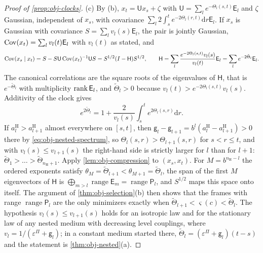 \begin{proof}[Proof of \cref{prop:obj-clocks}]
(c) By (b), $x_t=\mathsf Ux_s+\zeta$ with $\mathsf U=\sum_le^{-\Theta_l(s,t)}\mathsf E_l$ and $\zeta$ Gaussian, independent of $x_s$, with covariance $\sum_l2\int_s^te^{-2\Theta_l(r,t)}\mathrm dr\mathsf E_l$. If $x_s$ is Gaussian with covariance $S=\sum_lv_l(s)\mathsf E_l$, the pair is jointly Gaussian, $\operatorname{Cov}(x_t)=\sum_lv_l(t)\mathsf E_l$ with $v_l(t)$ as stated, and
\[
\operatorname{Cov}(x_s\mid x_t)=S-S\mathsf U\operatorname{Cov}(x_t)^{-1}\mathsf US=S^{1/2}(I-\mathsf H)S^{1/2},\qquad\mathsf H=\sum_l\frac{e^{-2\Theta_l(s,t)}v_l(s)}{v_l(t)}\mathsf E_l=\sum_le^{-2\tilde\Theta_l}\mathsf E_l.
\]
The canonical correlations are the square roots of the eigenvalues of $\mathsf H$, that is $e^{-\tilde\Theta_l}$ with multiplicity $\operatorname{rank}\mathsf E_l$, and $\tilde\Theta_l>0$ because $v_l(t)>e^{-2\Theta_l(s,t)}v_l(s)$. Additivity of the clock gives
\[
e^{2\tilde\Theta_l}=1+\frac2{v_l(s)}\int_s^te^{2\Theta_l(s,r)}\mathrm dr.
\]
If $a^{\mathrm H}_l>a^{\mathrm H}_{l+1}$ almost everywhere on $[s,t]$, then $\mathsf g_l-\mathsf g_{l+1}=b^l(a^{\mathrm H}_l-a^{\mathrm H}_{l+1})>0$ there by \eqref{eq:obj-nested-spectrum}, so $\Theta_l(s,r)>\Theta_{l+1}(s,r)$ for $s<r\le t$, and with $v_l(s)\le v_{l+1}(s)$ the right-hand side is strictly larger for $l$ than for $l+1$: $\tilde\Theta_1>\dots>\tilde\Theta_{n_{\mathrm H}+1}$. Apply \cref{lem:obj-compression} to $(x_s,x_t)$. For $M=b^{n_{\mathrm H}-l}$ the ordered exponents satisfy $\theta_M=\tilde\Theta_{l+1}<\theta_{M+1}=\tilde\Theta_l$, the span of the first $M$ eigenvectors of $\mathsf H$ is $\bigoplus_{m>l}\operatorname{range}\mathsf E_m=\operatorname{range}\mathsf P_l$, and $S^{1/2}$ maps this space onto itself. The argument of \cref{thm:obj-selection}(b) then shows that the frames with range $\operatorname{range}\mathsf P_l$ are the only minimizers exactly when $\tilde\Theta_{l+1}<\varsigma(c)<\tilde\Theta_l$. The hypothesis $v_l(s)\le v_{l+1}(s)$ holds for an isotropic law and for the stationary law of any nested medium with decreasing level couplings, where $v_l=1/(\varepsilon^\Pi+\mathsf g_l)$; in a constant medium started there, $\tilde\Theta_l=(\varepsilon^\Pi+\mathsf g_l)(t-s)$ and the statement is \cref{thm:obj-nested}(a).
\end{proof}

